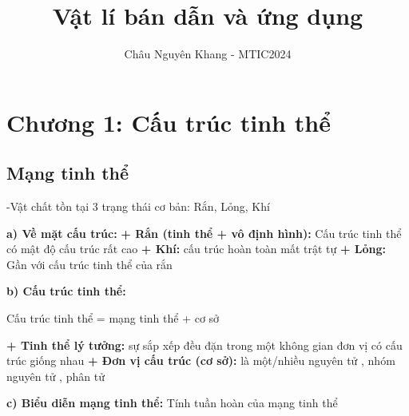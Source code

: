 \documentclass[12pt]{article}
\title{Vật lí bán dẫn và ứng dụng}
\author{Châu Nguyên Khang - MTIC2024}
\begin{document}
\setlength{\parindent}{10pt}
\maketitle
\newpage
\section{Chương 1: Cấu trúc tinh thể}
\subsection{Mạng tinh thể}
-Vật chất tồn tại 3 trạng thái cơ bản: Rắn, Lỏng, Khí
\begin{flushleft}
    \textbf{a) Về mặt cấu trúc:}
    \newline
    \textbf{+ Rắn (tinh thể + vô định hình):} Cấu trúc tinh thể có mật độ cấu trúc rất cao
    \newline
    \textbf{+ Khí:} cấu trúc hoàn toàn mất trật tự
    \newline
    \textbf{+ Lỏng:} Gần với cấu trúc tinh thể của rắn
\end{flushleft}
\begin{flushleft}
    \textbf{b) Cấu trúc tinh thể:}
    \smallskip
    \begin{center}
        Cấu trúc tinh thể  = mạng tinh thể  + cơ sở
    \end{center}
    \textbf{+ Tinh thể lý tưởng: } sự sắp xếp đều đặn trong một không gian đơn vị có cấu trúc giống nhau
    \newline
    \textbf{+ Đơn vị cấu trúc (cơ sở): } là một/nhiều nguyên tử , nhóm nguyên tử , phân tử
\end{flushleft}
\begin{flushleft}
    \textbf{c) Biểu diễn mạng tinh thể: }
    Tính tuần hoàn của mạng tinh thể
    
\end{flushleft}
\end{document}
